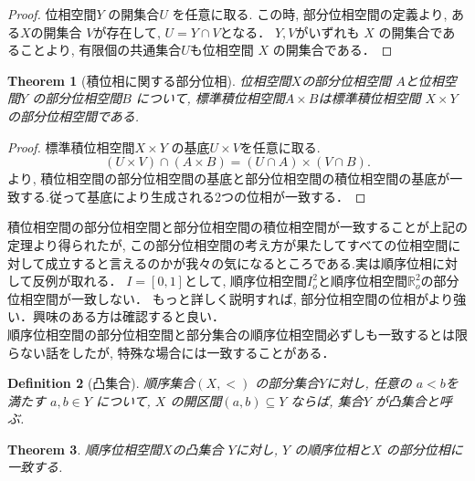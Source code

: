 \documentclass[lualatex]{ltjsbook}
\newtheorem{theorem}{Theorem}[chapter]
\newtheorem{definition}[theorem]{Definition}
\theoremstyle{remark}
\theoremstyle{plain}
\begin{document}
\begin{proof}
	位相空間$Y$ の開集合$U$ を任意に取る.
	この時,  部分位相空間の定義より,  ある$X$の開集合 $V$が存在して,   $U=Y\cap V$となる．
	$Y, V$がいずれも $X$ の開集合であることより,  有限個の共通集合$U$も位相空間 $X$ の開集合である．
\end{proof}

\begin{theorem}[積位相に関する部分位相]
	位相空間$X$の部分位相空間 $A$と位相空間$Y$ の部分位相空間$B$ について,  標準積位相空間$A\times B$は標準積位相空間 $X \times Y$の部分位相空間である.
\end{theorem}

\begin{proof}
	標準積位相空間$X \times Y$ の基底$U\times V$を任意に取る.
	 \[
		 \left(U \times V\right) \cap \left( A \times B \right) = \left( U \cap A  \right) \times \left( V \cap B \right) 
	.\]
	より,  積位相空間の部分位相空間の基底と部分位相空間の積位相空間の基底が一致する.従って基底により生成される2つの位相が一致する．
\end{proof}

積位相空間の部分位相空間と部分位相空間の積位相空間が一致することが上記の定理より得られたが,  
この部分位相空間の考え方が果たしてすべての位相空間に対して成立すると言えるのかが我々の気になるところである.実は順序位相に対して反例が取れる．
$I=[0, 1]$として,   順序位相空間$I^2_o$と順序位相空間$\mathbb{R}^2_o$の部分位相空間が一致しない．
もっと詳しく説明すれば,  部分位相空間の位相がより強い．興味のある方は確認すると良い．\\

順序位相空間の部分位相空間と部分集合の順序位相空間必ずしも一致するとは限らない話をしたが,  特殊な場合には一致することがある．\\

\begin{definition}[凸集合]
	順序集合$\left( X, < \right) $ の部分集合$Y$に対し,  任意の $a<b$を満たす $a, b \in Y$ について,  $X$ の開区間$\left( a, b \right) \subseteq Y$ ならば,  集合$Y$ が凸集合と呼ぶ.
\end{definition}

\begin{theorem}
	順序位相空間$X$の凸集合 $Y$に対し,   $Y$ の順序位相と$X$ の部分位相に一致する.
\end{theorem}
\end{document}
